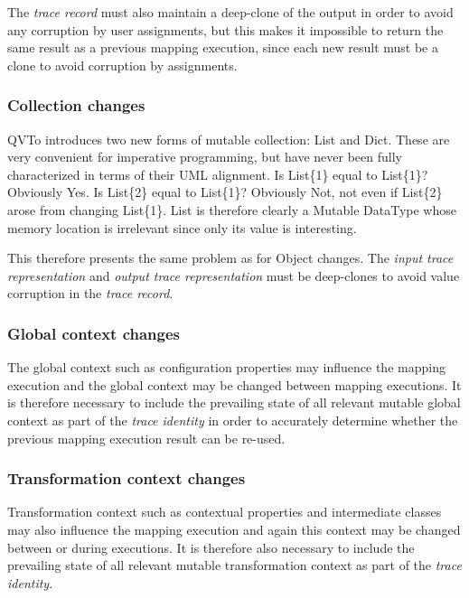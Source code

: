 \documentclass[runningheads,a4paper]{llncs}
\begin{document}
The \emph{trace record} must also maintain a deep-clone of the output in order to avoid any corruption by user assignments, but this makes it impossible to return the same result as a previous mapping execution, since each new result must be a clone to avoid corruption by assignments.

\subsubsection{Collection changes}

QVTo introduces two new forms of mutable collection: List and Dict. These are very convenient for imperative programming, but have never been fully characterized in terms of their UML alignment. Is List\{1\} equal to List\{1\}? Obviously Yes. Is List\{2\} equal to List\{1\}? Obviously Not, not even if List\{2\} arose from changing List\{1\}. List is therefore clearly a Mutable DataType whose  memory location is irrelevant since only its value is interesting.

This therefore presents the same problem as for Object changes. The \emph{input trace representation} and \emph{output trace representation} must be deep-clones to avoid value corruption in the \emph{trace record}.

\subsubsection{Global context changes}

The global context such as configuration properties may influence the mapping execution and the global context may be changed between mapping executions. It is therefore necessary to include the prevailing state of all relevant mutable global context as part of the \emph{trace identity} in order to accurately determine whether the previous mapping execution result can be re-used.

\subsubsection{Transformation context changes}

Transformation context such as contextual properties and intermediate classes may also influence the mapping execution and again this context may be changed between or during executions. It is therefore also necessary to include the prevailing state of all relevant mutable transformation context as part of the \emph{trace identity}.
\end{document}
